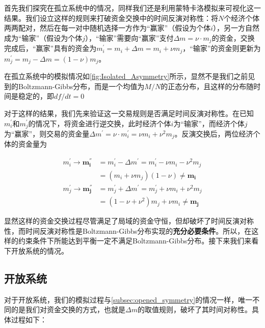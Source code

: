 \documentclass[tsinghuacite]{HustGraduPaper}
\begin{document}
	
	首先我们探究在孤立系统中的情况，同样我们还是利用蒙特卡洛模拟来可视化这一结果。我们设立这样的规则来打破资金交换中的时间反演对称性：将$N$个经济个体两两配对，然后在每一对中随机选择一方作为“赢家”（假设为个体$i$），另一方自然成为“输家”（假设为个体$j$），“输家”需要向“赢家”支付$\Delta m = \nu \cdot m_j$的资金，交换完成后，“赢家”具有的资金为$m_i^{'} = m_i + \Delta m = m_i + \nu m_j$，“输家”的资金则更新为$m_j^{'} = m_j - \Delta m  = (1 - \nu) m_j$。
	
	在孤立系统中的模拟情况如\autoref{fig:Isolated_Asymmetry}所示，显然不是我们之前见到的Boltzmann-Gibbs分布，而是一个均值为$M/N$的正态分布，且这样的分布随时间是稳定的，即$df/dt = 0$
	
	对于这样的结果，我们先来验证这一交易规则是否满足时间反演对称性。在已知$m_i^{'}$和$m_j^{'}$的情况下，将资金进行逆交换，此时经济个体$i$为“输家”，而经济个体$j$为“赢家”，则交易的资金量$\Delta m^{'} = \nu \cdot m_i^{'} = \nu m_i + \nu^{2} m_j$。反演交换后，两位经济个体的资金量为
	
	\begin{align}
		m_i^{'} \rightarrow \bm{m_{i}^{''}} &= m_i^{'} - \Delta m^{'} = m_i^{'} - \nu m_i - \nu^{2} m_j  \\
							     &= (m_i + \nu m_j) (1 - \nu) \neq \bm{m_i}  \\
		m_j^{'} \rightarrow \bm{m_{j}^{''}} &= m_j^{'} + \Delta m^{'} = m_j^{'} + \nu m_i + \nu^{2} m_j \\
							     &= (1 - \nu + \nu^{2}) m_j + \nu m_i \neq  \bm{m_j} \label{eq32}
	\end{align}
	
	\vspace{1.5em} 
	
	显然这样的资金交换过程尽管满足了局域的资金守恒，但却破坏了时间反演对称性，而时间反演对称性是Boltzmann-Gibbs分布实现的{\bfseries 充分必要条件}。所以，在这样的约束条件下所能达到平衡一定不满足Boltzmann-Gibbs分布。接下来我们来看下开放系统的情况。
	

	\subsection{开放系统}\label{subsec:beyond_opened}

		对于开放系统，我们的模拟过程与\autoref{subsec:opened_symmetry}的情况一样，唯一不同的是我们对资金交换的方式，也就是$\Delta m$的取值规则，破坏了其时间对称性。具体过程如下：
		
\end{document}
